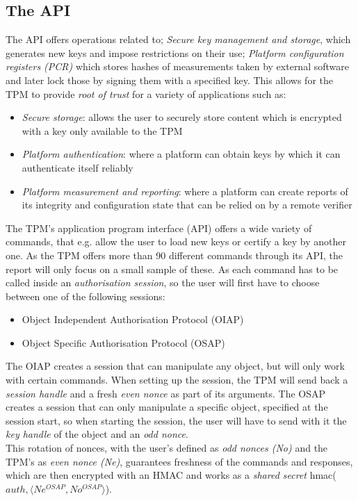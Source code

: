 \subsection{The API}
The API offers operations related to; \textit{Secure key management and storage}, which generates new keys and impose restrictions on their use; \textit{Platform configuration registers (PCR)} which stores hashes of measurements taken by external software and later lock those by signing them with a specified key. This allows for the TPM to provide \textit{root of trust} for a variety of applications such as:
\begin{itemize}
	\item \textit{Secure storage}: allows the user to securely store content which is encrypted with a key only available to the TPM
	\item \textit{Platform authentication}: where a platform can obtain keys by which it can authenticate itself reliably
	\item \textit{Platform measurement and reporting}: where a platform can create reports of its integrity and configuration state that can be relied on by a remote verifier
\end{itemize}
The TPM's application program interface (API) offers a wide variety of commands, that e.g. allow the user to load new keys or certify a key by another one. As the TPM offers more than 90 different commands through its API, the report will only focus on a small sample of these. As each command has to be called inside an \textit{authorisation session}, so the user will first have to choose between one of the following sessions:
\begin{itemize}
  \item Object Independent Authorisation Protocol (OIAP)
  \item Object Specific Authorisation Protocol (OSAP)
\end{itemize}
The OIAP creates a session that can manipulate any object, but will only work with certain commands. When setting up the session, the TPM will send back a \textit{session handle} and a fresh \textit{even nonce} as part of its arguments. 
The OSAP creates a session that can only manipulate a specific object, specified at the session start, so when starting the session, the user will have to send with it the \textit{key handle} of the object and an \textit{odd nonce}. \\
This rotation of nonces, with the user's defined as \textit{odd nonces (No)} and the TPM's as \textit{even nonce (Ne)}, guarantees freshness of the commands and responses, which are then encrypted with an HMAC and works as a \textit{shared secret} hmac($auth, \langle Ne^{OSAP}, No^{OSAP} \rangle $). \\ \\

